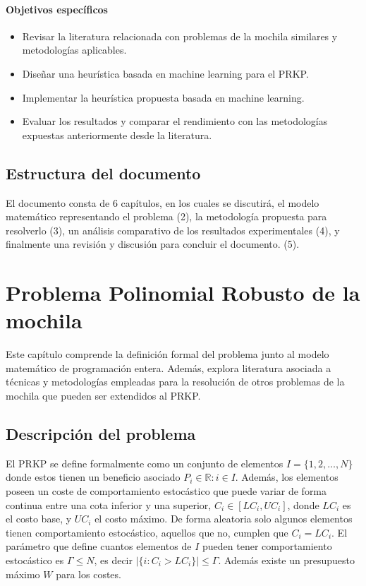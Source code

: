 \documentclass[spanish, a4paper, 12pt, openany,final]{book}
\begin{document}
\subsubsection*{Objetivos específicos}
\begin{itemize}
	\item Revisar la literatura relacionada con problemas de la mochila similares y metodologías aplicables.
	\item Diseñar una heurística basada en machine learning para el PRKP.
	\item Implementar la heurística propuesta basada en machine learning.
	\item Evaluar los resultados y comparar el rendimiento con las metodologías expuestas anteriormente desde la literatura.
\end{itemize}

\section{Estructura del documento}

El documento consta de 6 capítulos, en los cuales se discutirá, el modelo matemático representando el problema (2), la metodología propuesta para resolverlo (3), un análisis comparativo de los resultados experimentales (4), y finalmente una revisión y discusión para concluir el documento. (5).

\clearpage

\chapter{Problema Polinomial Robusto de la mochila}
Este capítulo comprende la definición formal del problema junto al modelo matemático de programación entera. Además, explora literatura asociada a técnicas y metodologías empleadas para la resolución de otros problemas de la mochila que pueden ser extendidos al PRKP.

\section{Descripción del problema}
	El PRKP se define formalmente como un conjunto de elementos $I = \{1,2,\hdots,N\}$ donde estos tienen un beneficio asociado $P_i \in \mathbb{R}:i\in I$. Además, los elementos poseen un coste de comportamiento estocástico que puede variar de forma continua entre una cota inferior y una superior, $C_i \in [LC_i,UC_i]$, donde $LC_i$ es el costo base, y $UC_i$ el costo máximo. De forma aleatoria solo algunos elementos tienen comportamiento estocástico, aquellos que no, cumplen que $C_i = LC_i$. El parámetro que define cuantos elementos de $I$ pueden tener comportamiento estocástico es $\Gamma\leq N$, es decir $|\{i: C_i > LC_i\}| \leq \Gamma$. 	Además existe un presupuesto máximo $W$ para los costes.
	
\end{document}
